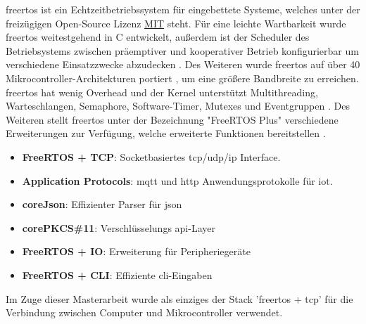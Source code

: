 \documentclass[../EDF Master Thesis.tex]{subfiles}
\begin{document}
\ac{freertos} ist ein Echtzeitbetriebssystem für eingebettete Systeme, welches unter der freizügigen Open-Source Lizenz \href{https://de.wikipedia.org/wiki/MIT-Lizenz}{MIT} steht.
Für eine leichte Wartbarkeit wurde \ac{freertos} weitestgehend in C entwickelt, außerdem ist der Scheduler des Betriebsystems zwischen präemptiver und kooperativer Betrieb konfigurierbar um verschiedene Einsatzzwecke abzudecken \parencite{wiki:002}.
Des Weiteren wurde \ac{freertos} auf über 40 Mikrocontroller-Architekturen portiert \parencite{freertos}, um eine größere Bandbreite zu erreichen.
\ac{freertos} hat wenig Overhead und der Kernel unterstützt Multithreading, Warteschlangen, Semaphore, Software-Timer, Mutexes und Eventgruppen \parencite{freertos-features}.
Des Weiteren stellt \ac{freertos} unter der Bezeichnung "FreeRTOS Plus" verschiedene Erweiterungen zur Verfügung, welche erweiterte Funktionen bereitstellen \parencite{freertos-extensions}.
\begin{itemize}
    \item \textbf{FreeRTOS + TCP}: Socketbasiertes \acs{tcp}/\acs{udp}/\acs{ip} Interface.
    \item \textbf{Application Protocols}: \acs{mqtt} und \acs{http} Anwendungsprotokolle für \acs{iot}.
    \item \textbf{coreJson}: Effizienter Parser für \acs{json}
    \item \textbf{corePKCS\#11}: Verschlüsselungs \acs{api}-Layer
    \item \textbf{FreeRTOS + IO}: Erweiterung für Peripheriegeräte
    \item \textbf{FreeRTOS + CLI}: Effiziente \acs{cli}-Eingaben
\end{itemize}

Im Zuge dieser Masterarbeit wurde als einziges der Stack '\ac{freertos} + \acs{tcp}' für die Verbindung zwischen Computer und Mikrocontroller verwendet.
\end{document}

